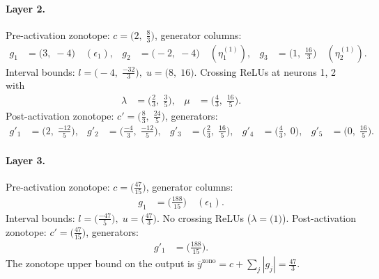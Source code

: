\documentclass[11pt]{article}
\begin{document}
\paragraph{Layer 2.}
Pre-activation zonotope: $c = \bigl(2,\; \frac{8}{3}\bigr)$, generator columns:
\begin{align*}
g_{1} &= \bigl(3,\; -4\bigr) \quad (\epsilon_{1}), &
g_{2} &= \bigl(-2,\; -4\bigr) \quad (\eta^{(1)}_{1}), &
g_{3} &= \bigl(1,\; \frac{16}{3}\bigr) \quad (\eta^{(1)}_{2}).
\end{align*}
Interval bounds: $l = \bigl(-4,\; \frac{-32}{3}\bigr), \; u = \bigl(8,\; 16\bigr)$. 
Crossing ReLUs at neurons 1, 2 with
\begin{align*}
\lambda &= \bigl(\frac{2}{3},\; \frac{3}{5}\bigr), & \mu &= \bigl(\frac{4}{3},\; \frac{16}{5}\bigr).
\end{align*}
Post-activation zonotope: $c' = \bigl(\frac{8}{3},\; \frac{24}{5}\bigr)$, generators:
\begin{align*}
g'_{1} &= \bigl(2,\; \frac{-12}{5}\bigr), &
g'_{2} &= \bigl(\frac{-4}{3},\; \frac{-12}{5}\bigr), &
g'_{3} &= \bigl(\frac{2}{3},\; \frac{16}{5}\bigr), &
g'_{4} &= \bigl(\frac{4}{3},\; 0\bigr), &
g'_{5} &= \bigl(0,\; \frac{16}{5}\bigr).
\end{align*}
\paragraph{Layer 3.}
Pre-activation zonotope: $c = \bigl(\frac{47}{15}\bigr)$, generator columns:
\begin{align*}
g_{1} &= \bigl(\frac{188}{15}\bigr) \quad (\epsilon_{1}).
\end{align*}
Interval bounds: $l = \bigl(\frac{-47}{5}\bigr), \; u = \bigl(\frac{47}{3}\bigr)$. 
No crossing ReLUs ($\lambda = \bigl(1\bigr)$).
Post-activation zonotope: $c' = \bigl(\frac{47}{15}\bigr)$, generators:
\begin{align*}
g'_{1} &= \bigl(\frac{188}{15}\bigr).
\end{align*}
The zonotope upper bound on the output is $\overline{y}^{\text{zono}} = c + \sum_j |g_j| = \frac{47}{3}$.
\end{document}
